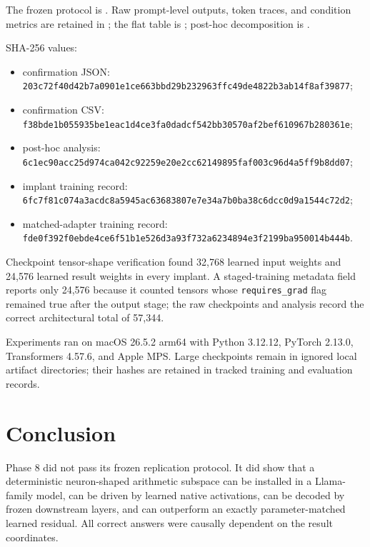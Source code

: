 \documentclass[11pt]{article}
\newcommand{\code}[1]{\texttt{#1}}
\begin{document}
The frozen protocol is
. Raw prompt-level outputs,
token traces, and condition metrics are retained in
; the flat table is
; post-hoc decomposition is
.

SHA-256 values:

\begin{sloppypar}
\begin{itemize}
\scriptsize
\item confirmation JSON:
\code{203c72f40d42b7a0901e1ce663bbd29b232963ffc49de4822b3ab14f8af39877};
\item confirmation CSV:
\code{f38bde1b055935be1eac1d4ce3fa0dadcf542bb30570af2bef610967b280361e};
\item post-hoc analysis:
\code{6c1ec90acc25d974ca042c92259e20e2cc62149895faf003c96d4a5ff9b8dd07};
\item implant training record:
\code{6fc7f81c074a3acdc8a5945ac63683807e7e34a7b0ba38c6dcc0d9a1544c72d2};
\item matched-adapter training record:
\code{fde0f392f0ebde4ce6f51b1e526d3a93f732a6234894e3f2199ba950014b444b}.
\end{itemize}
\end{sloppypar}

Checkpoint tensor-shape verification found 32,768 learned input weights and
24,576 learned result weights in every implant. A staged-training metadata
field reports only 24,576 because it counted tensors whose
\code{requires\_grad} flag remained true after the output stage; the raw
checkpoints and analysis record the correct architectural total of 57,344.

Experiments ran on macOS 26.5.2 arm64 with Python 3.12.12, PyTorch 2.13.0,
Transformers 4.57.6, and Apple MPS. Large checkpoints remain in ignored local
artifact directories; their hashes are retained in tracked training and
evaluation records.

\section{Conclusion}

Phase 8 did not pass its frozen replication protocol. It did show that a
deterministic neuron-shaped arithmetic subspace can be installed in a
Llama-family model, can be driven by learned native activations, can be decoded
by frozen downstream layers, and can outperform an exactly parameter-matched
learned residual. All correct answers were causally dependent on the result
coordinates.
\end{document}
